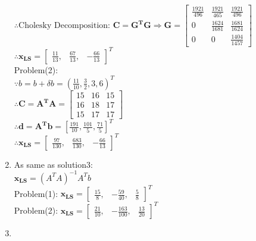 \documentclass[english,onecolumn]{IEEEtran}
\begin{document}
\begin{enumerate}
    $\therefore    \text{Cholesky Decomposition:  }   \mathbf{C = G^T G}  \Rightarrow  \mathbf{G} = 
    \begin{bmatrix}
    \frac{1921}{496} & \frac{1921}{465}  & \frac{1921}{496}  \\
    0 & \frac{1624}{1681}  &  \frac{1681}{1624}  \\
    0 & 0  &  \frac{1404}{1457}  
    \end{bmatrix}
    $\\
    
    $\therefore   \mathbf{x_{LS}}  = \begin{bmatrix}
    \frac{11}{13}, & \frac{67}{13},  &  -\frac{66}{13}  
    \end{bmatrix} ^T
    $\\
    Problem(2):\\
    $\because b=b + \delta b =  (\frac{11}{10},\frac{3}{2},3,6)^T$\\
    $\therefore \mathbf{C = A^T A }= 
    \begin{bmatrix}
    15 & 16  &  15  \\
    16 & 18  &  17  \\
    15 & 17  &  17  
    \end{bmatrix}$\\
    $\therefore  \mathbf{d = A^T b} = [\frac{191}{10}, \frac{101}{5}, \frac{71}{5} ]^T$\\
    $\therefore \mathbf{x_{LS}} = \begin{bmatrix}
    \frac{97}{130}, & \frac{683}{130},  &  -\frac{66}{13}  
    \end{bmatrix} ^T
    $\\

    \item
    As same as solution3:\\
    $\mathbf{x_{LS}} = (A^T A)^{-1} A^T b $\\
    Problem(1): $ \mathbf{x_{LS}} = \begin{bmatrix}
    \frac{15}{8}, & -\frac{59}{40},  &  \frac{5}{8}  
    \end{bmatrix} ^T
    $\\
    Problem(2): $ \mathbf{x_{LS}} = \begin{bmatrix}
    \frac{21}{10}, & -\frac{163}{100} , &  \frac{13}{20}  
    \end{bmatrix} ^T
    $\\
    
    \item
    

\end{enumerate}
\end{document}
